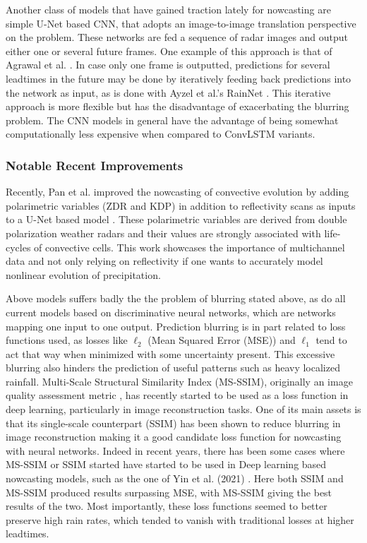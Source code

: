 Another class of models that have gained traction lately for nowcasting are simple U-Net based CNN, that adopts an image-to-image translation perspective on the problem. These networks are fed a sequence of radar images and output either one or several future frames. One example of this approach is  that of Agrawal et al. \cite{agrawal_machine_2019}. In case only one frame is outputted, predictions for several leadtimes in the future may be done by iteratively feeding back predictions into the network as input, as is done with Ayzel et al.'s RainNet \cite{ayzel_rainnet_nodate}. This iterative approach is more flexible but has the disadvantage of exacerbating the blurring problem. The CNN models in general have the advantage of being somewhat computationally less expensive when compared to ConvLSTM variants. 

\subsubsection*{Notable Recent Improvements}

Recently, Pan et al. improved the nowcasting of convective evolution by adding  polarimetric variables (ZDR and KDP) in addition to reflectivity scans as inputs to a U-Net based model \cite{pan_improving_2021}. These polarimetric variables are derived from double polarization weather radars and their values are strongly associated with life-cycles of convective cells. This work showcases the importance of multichannel data and not only relying on reflectivity if one wants to accurately model nonlinear evolution of precipitation.

Above models suffers badly the the problem of blurring stated above, as do all current models based on discriminative neural networks, which are networks mapping one input to one output. Prediction blurring is in part related to loss functions used, as losses like $\ell_2$ (Mean Squared Error (MSE)) and $\ell_1$ tend to act that way when minimized with some uncertainty present. This excessive blurring also hinders the prediction of useful patterns such as heavy localized rainfall.
Multi-Scale Structural Similarity Index (MS-SSIM), originally an image quality assessment metric \cite{wang_multiscale_2003}, has recently started to be used as a loss function in deep learning, particularly in image reconstruction tasks. One of its main assets is that its single-scale counterpart (SSIM) has been shown to reduce blurring in image reconstruction \cite{zhao_loss_2017} making it a good candidate loss function for nowcasting with neural networks.  Indeed in recent years, there has been some cases where MS-SSIM or SSIM started have started to be used in Deep learning based nowcasting models, such as the one of Yin et al. (2021) \cite{yin_application_2021}. Here both SSIM and MS-SSIM produced results surpassing MSE, with MS-SSIM giving the best results of the two. Most importantly, these loss functions seemed to better preserve high rain rates, which tended to vanish with traditional losses at higher leadtimes. 

